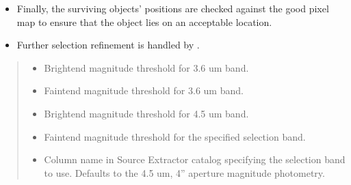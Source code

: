 \documentclass[letterpaper,12pt,english]{sphinxmanual}
\begin{document}
\begin{fulllineitems}
\begin{fulllineitems}
\begin{description}
\begin{itemize}
\item {} 
\sphinxAtStartPar
Finally, the surviving objects’ positions are checked against the good pixel map to ensure that the object
lies on an acceptable location.

\item {} 
\sphinxAtStartPar
Further selection refinement is handled by {\hyperref[\detokenize{api/selector:SPTclIRAGN.Pipeline_functions.SelectIRAGN.selection_membership}]{}}.

\end{itemize}

\end{description}
\begin{quote}\begin{description}
\begin{itemize}
\item {} 
\sphinxAtStartPar
{} \textendash{} Bright\sphinxhyphen{}end magnitude threshold for 3.6 um band.

\item {} 
\sphinxAtStartPar
{} \textendash{} Faint\sphinxhyphen{}end magnitude threshold for 3.6 um band.

\item {} 
\sphinxAtStartPar
{} \textendash{} Bright\sphinxhyphen{}end magnitude threshold for 4.5 um band.

\item {} 
\sphinxAtStartPar
{} \textendash{} Faint\sphinxhyphen{}end magnitude threshold for the specified selection band.

\item {} 
\sphinxAtStartPar
{} \textendash{} Column name in Source Extractor catalog specifying the selection band to use. Defaults to the 4.5 um, 4”
aperture magnitude photometry.

\end{itemize}

\end{description}\end{quote}

\end{fulllineitems}



\end{fulllineitems}
\end{document}

